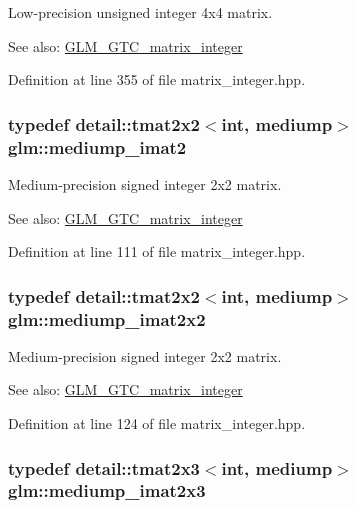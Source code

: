 Low-precision unsigned integer 4x4 matrix. \begin{Desc}
\item[See also:]\hyperlink{group__gtc__matrix__integer}{GLM\_\-GTC\_\-matrix\_\-integer} \end{Desc}


Definition at line 355 of file matrix\_\-integer.hpp.\hypertarget{group__gtc__matrix__integer_gec03a8eef2ec2536f8bebffd0bac8192}{
\subsubsection[mediump\_\-imat2]{\setlength{\rightskip}{0pt plus 5cm}typedef detail::tmat2x2$<$int, mediump$>$ {\bf glm::mediump\_\-imat2}}}
\label{group__gtc__matrix__integer_gec03a8eef2ec2536f8bebffd0bac8192}


Medium-precision signed integer 2x2 matrix. \begin{Desc}
\item[See also:]\hyperlink{group__gtc__matrix__integer}{GLM\_\-GTC\_\-matrix\_\-integer} \end{Desc}


Definition at line 111 of file matrix\_\-integer.hpp.\hypertarget{group__gtc__matrix__integer_g472222f6e3754124ee9cb64acaaedac1}{
\subsubsection[mediump\_\-imat2x2]{\setlength{\rightskip}{0pt plus 5cm}typedef detail::tmat2x2$<$int, mediump$>$ {\bf glm::mediump\_\-imat2x2}}}
\label{group__gtc__matrix__integer_g472222f6e3754124ee9cb64acaaedac1}


Medium-precision signed integer 2x2 matrix. \begin{Desc}
\item[See also:]\hyperlink{group__gtc__matrix__integer}{GLM\_\-GTC\_\-matrix\_\-integer} \end{Desc}


Definition at line 124 of file matrix\_\-integer.hpp.\hypertarget{group__gtc__matrix__integer_gbc92c714c2d257213c5b0771669df177}{
\subsubsection[mediump\_\-imat2x3]{\setlength{\rightskip}{0pt plus 5cm}typedef detail::tmat2x3$<$int, mediump$>$ {\bf glm::mediump\_\-imat2x3}}}
\label{group__gtc__matrix__integer_gbc92c714c2d257213c5b0771669df177}



